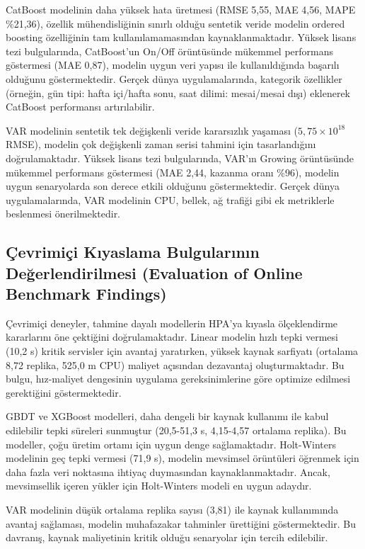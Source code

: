 CatBoost modelinin daha yüksek hata üretmesi (RMSE 5,55, MAE 4,56, MAPE \%21,36), özellik mühendisliğinin sınırlı olduğu sentetik veride modelin ordered boosting özelliğinin tam kullanılamamasından kaynaklanmaktadır. Yüksek lisans tezi bulgularında, CatBoost'un On/Off örüntüsünde mükemmel performans göstermesi (MAE 0,87), modelin uygun veri yapısı ile kullanıldığında başarılı olduğunu göstermektedir. Gerçek dünya uygulamalarında, kategorik özellikler (örneğin, gün tipi: hafta içi/hafta sonu, saat dilimi: mesai/mesai dışı) eklenerek CatBoost performansı artırılabilir.

VAR modelinin sentetik tek değişkenli veride kararsızlık yaşaması ($5,75\times10^{18}$ RMSE), modelin çok değişkenli zaman serisi tahmini için tasarlandığını doğrulamaktadır. Yüksek lisans tezi bulgularında, VAR'ın Growing örüntüsünde mükemmel performans göstermesi (MAE 2,44, kazanma oranı \%96), modelin uygun senaryolarda son derece etkili olduğunu göstermektedir. Gerçek dünya uygulamalarında, VAR modelinin CPU, bellek, ağ trafiği gibi ek metriklerle beslenmesi önerilmektedir.

\subsection{Çevrimiçi Kıyaslama Bulgularının Değerlendirilmesi (Evaluation of Online Benchmark Findings)}

Çevrimiçi deneyler, tahmine dayalı modellerin HPA'ya kıyasla ölçeklendirme kararlarını öne çektiğini doğrulamaktadır. Linear modelin hızlı tepki vermesi (10,2 s) kritik servisler için avantaj yaratırken, yüksek kaynak sarfiyatı (ortalama 8,72 replika, 525,0 m CPU) maliyet açısından dezavantaj oluşturmaktadır. Bu bulgu, hız-maliyet dengesinin uygulama gereksinimlerine göre optimize edilmesi gerektiğini göstermektedir.

GBDT ve XGBoost modelleri, daha dengeli bir kaynak kullanımı ile kabul edilebilir tepki süreleri sunmuştur (20,5-51,3 s, 4,15-4,57 ortalama replika). Bu modeller, çoğu üretim ortamı için uygun denge sağlamaktadır. Holt-Winters modelinin geç tepki vermesi (71,9 s), modelin mevsimsel örüntüleri öğrenmek için daha fazla veri noktasına ihtiyaç duymasından kaynaklanmaktadır. Ancak, mevsimsellik içeren yükler için Holt-Winters modeli en uygun adaydır.

VAR modelinin düşük ortalama replika sayısı (3,81) ile kaynak kullanımında avantaj sağlaması, modelin muhafazakar tahminler ürettiğini göstermektedir. Bu davranış, kaynak maliyetinin kritik olduğu senaryolar için tercih edilebilir.

